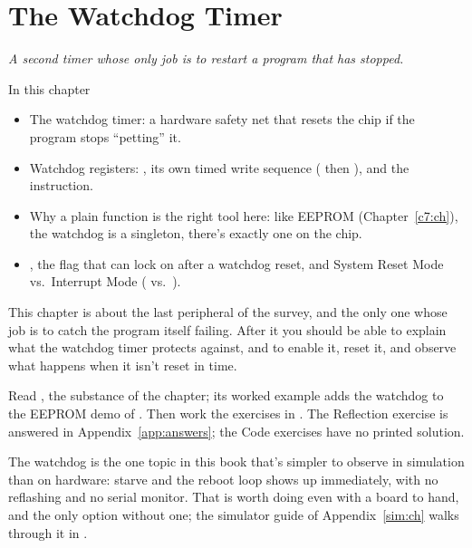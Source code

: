 
\chapter{The Watchdog Timer}
\label{c8:ch}

{\large\itshape A second timer whose only job is to restart a program that has stopped.\par}

\begin{chapterbox}{In this chapter}
\begin{itemize}
  \item The watchdog timer: a hardware safety net that resets the chip if the program stops
    ``petting'' it.
  \item Watchdog registers: , its own timed write sequence ( then
    ), and the  instruction.
  \item Why a plain function is the right tool here: like EEPROM (Chapter~\ref{c7:ch}), the
    watchdog is a singleton, there's exactly one on the chip.
  \item {}, the flag that can lock  on after a watchdog reset, and System Reset
    Mode vs.\ Interrupt Mode ( vs.\ ).
\end{itemize}
\end{chapterbox}

This chapter is about the last peripheral of the survey, and the only one whose job is to catch
the program itself failing. After it you should be able to explain what the watchdog timer
protects against, and to enable it, reset it, and observe what happens when it isn't reset in
time.

Read , the substance of the chapter; its worked example adds the watchdog to
the EEPROM demo of . Then work the exercises in . The
Reflection exercise is answered in Appendix~\ref{app:answers}; the Code exercises have no printed
solution.

The watchdog is the one topic in this book that's simpler to observe in simulation than on
hardware: starve  and the reboot loop shows up immediately, with no
reflashing and no serial monitor. That is worth doing even with a board to hand, and the only
option without one; the simulator guide of Appendix~\ref{sim:ch} walks through it in
.




